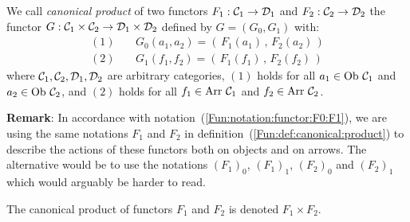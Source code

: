 \begin{defin}\label{Fun:def:canonical:product}
    We call {\em canonical product} of two functors $F_{1}:\mbox{${\cal C}_{1}$}\to\mbox{${\cal D}_{1}$}$ and
    $F_{2}:\mbox{${\cal C}_{2}$}\to\mbox{${\cal D}_{2}$}$ the functor $G:\mbox{${\cal C}_{1}$}\times\mbox{${\cal C}_{2}$}\to\mbox{${\cal D}_{1}$}\times\mbox{${\cal D}_{2}$}$
    defined by $G=(G_{0},G_{1})$ with:
        \begin{eqnarray*}
            (1)&\ &G_{0}(a_{1},a_{2}) = (\,F_{1}(a_{1})\,,\,F_{2}(a_{2})\,)\\
            (2)&\ &G_{1}(f_{1},f_{2}) = (\,F_{1}(f_{1})\,,\,F_{2}(f_{2})\,)
        \end{eqnarray*}
    where $\mbox{${\cal C}_{1}$},\mbox{${\cal C}_{2}$}, \mbox{${\cal D}_{1}$}, \mbox{${\cal D}_{2}$}$ are arbitrary categories, $(1)$ holds 
    for all $a_{1}\in\mbox{\rm Ob}\ \mbox{${\cal C}_{1}$}$ and $a_{2}\in\mbox{\rm Ob}\ \mbox{${\cal C}_{2}$}$, and $(2)$ holds 
    for all $f_{1}\in\mbox{\rm Arr}\ \mbox{${\cal C}_{1}$}$ and $f_{2}\in\mbox{\rm Arr}\ \mbox{${\cal C}_{2}$}$.
\end{defin}
\noindent
{\bf Remark}: In accordance with notation~(\ref{Fun:notation:functor:F0:F1}),
we are using the same notations $F_{1}$ and $F_{2}$ in 
definition~(\ref{Fun:def:canonical:product}) to describe the actions of these
functors both on objects and on arrows. The alternative would be to use the
notations $(F_{1})_{0}$, $(F_{1})_{1}$, $(F_{2})_{0}$ and $(F_{2})_{1}$ which 
would arguably be harder to read.

\begin{notation}\label{Fun:notation:canonical:product}
    The canonical product of functors $F_{1}$ and $F_{2}$ is denoted
    $F_{1}\times F_{2}$.
\end{notation}

